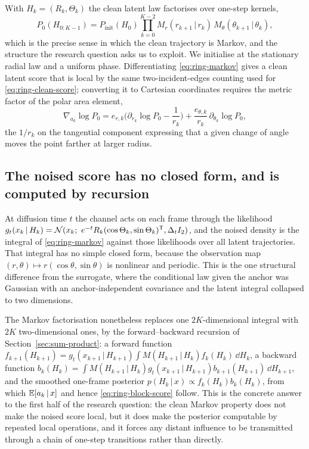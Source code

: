 With $H_k = (R_k, \Theta_k)$ the clean latent law factorises over one-step
kernels,
\begin{equation}
  P_0(H_{0:K-1})
  = P_{\mathrm{init}}(H_0)
    \prod_{k=0}^{K-2} M_r(r_{k+1}\,|\,r_k)\, M_\theta(\theta_{k+1}\,|\,\theta_k) ,
  \label{eq:ring-markov}
\end{equation}
which is the precise sense in which the clean trajectory is Markov, and the
structure the research question asks us to exploit. We initialise at the
stationary radial law and a uniform phase. Differentiating
\eqref{eq:ring-markov} gives a clean latent score that is local by the same
two-incident-edges counting used for \eqref{eq:ring-clean-score}; converting it
to Cartesian coordinates requires the metric factor of the polar area element,
\begin{equation}
  \nabla_{a_k} \log P_0
  = e_{r,k}\Big(\partial_{r_k}\log P_0 - \frac{1}{r_k}\Big)
    + \frac{e_{\theta,k}}{r_k}\, \partial_{\theta_k} \log P_0 ,
  \label{eq:ring-polar-to-cart}
\end{equation}
the $1/r_k$ on the tangential component expressing that a given change of angle
moves the point farther at larger radius.

\subsection{The noised score has no closed form, and is computed by recursion}

At diffusion time $t$ the channel acts on each frame through the likelihood
$g_t(x_k\,|\,H_k) = \Nd(x_k;\ e^{-t}R_k(\cos\Theta_k,\sin\Theta_k)^{\T},
\Deltat I_2)$, and the noised density is the integral of
\eqref{eq:ring-markov} against those likelihoods over all latent trajectories.
That integral has no simple closed form, because the observation map
$(r,\theta) \mapsto r(\cos\theta, \sin\theta)$ is nonlinear and periodic. This
is the one structural difference from the surrogate, where the conditional law
given the anchor was Gaussian with an anchor-independent covariance and the
latent integral collapsed to two dimensions.

The Markov factorisation nonetheless replaces one $2K$-dimensional integral
with $2K$ two-dimensional ones, by the forward--backward recursion of
Section~\ref{sec:sum-product}: a forward function
$f_{k+1}(H_{k+1}) = g_t(x_{k+1}\,|\,H_{k+1})
\int M(H_{k+1}\,|\,H_k) f_k(H_k)\,\dd H_k$, a backward function
$b_k(H_k) = \int M(H_{k+1}\,|\,H_k) g_t(x_{k+1}\,|\,H_{k+1}) b_{k+1}(H_{k+1})
\,\dd H_{k+1}$, and the smoothed one-frame posterior
$p(H_k\,|\,x) \propto f_k(H_k) b_k(H_k)$, from which
$\mathbb{E}[a_k\,|\,x]$ and hence \eqref{eq:ring-block-score} follow. This is the
concrete answer to the first half of the research question: the clean Markov
property does not make the noised score local, but it does make the posterior
computable by repeated local operations, and it forces any distant influence to
be transmitted through a chain of one-step transitions rather than directly.


